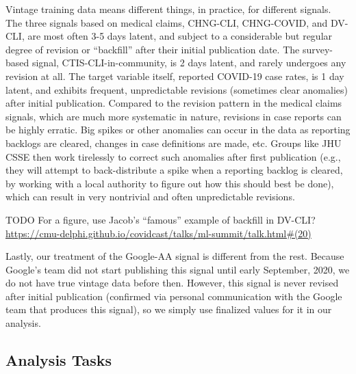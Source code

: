 \documentclass[9pt,twocolumn,twoside,lineno]{pnas-new}
\begin{document}
Vintage training data means different things, in practice, for different
signals. The three signals based on medical claims, CHNG-CLI, CHNG-COVID, and
DV-CLI, are most often 3-5 days latent, and subject to a considerable but
regular degree of revision or ``backfill'' after their initial publication date.
The survey-based signal, CTIS-CLI-in-community, is 2 days latent, and rarely
undergoes any revision at all.  The target variable itself, reported COVID-19
case rates, is 1 day latent, and exhibits frequent, unpredictable revisions
(sometimes clear anomalies) after initial publication.  Compared to the revision
pattern in the medical claims signals, which are much more systematic in nature,
revisions in case reports can be highly erratic. Big spikes or other anomalies
can occur in the data as reporting backlogs are cleared, changes in case
definitions are made, etc. Groups like JHU CSSE then work tirelessly to correct
such anomalies after first publication (e.g., they will attempt to
back-distribute a spike when a reporting backlog is cleared, by working with a
local authority to figure out how this should best be done), which can result
in very nontrivial and often unpredictable revisions.      

TODO For a figure, use Jacob's ``famous'' example of backfill in DV-CLI?   
\url{https://cmu-delphi.github.io/covidcast/talks/ml-summit/talk.html#(20)} 

Lastly, our treatment of the Google-AA signal is different from the rest.
Because Google's team did not start publishing this signal until early
September, 2020, we do not have true vintage data before then.  However, this
signal is never revised after initial publication (confirmed via personal
communication with the Google team that produces this signal), so we simply use
finalized values for it in our analysis.   

\subsection{Analysis Tasks}
\end{document}
